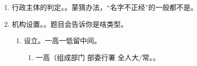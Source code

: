 \begin{enumerate}
\begin{enumerate}
\begin{enumerate}
                  \item 后天公法人 = 法律、法规、规章授权无行政权能组织。。
                  \item vs 委托。是委托关系，不是公法人，
                \end{enumerate}
                \begin{kk}{委托 vs 授权}
                  \begin{enumerate}
                    \item 这事我能委托还是授权给你我说了不算，得看法律、法规、规章咋说的。
                    \item {}（谁给你这个权力去授权的）。
                          \begin{enumerate}
                            \item 强制执行权 \yjt 只能法律。
                            \item 强制措施权 \yjt 只能法律、行政法规。
                            \item 普通权力（有单行立法） \yjt 法律、法规。。
                            \item 一般权力（没有单行立法） \yjt 法律、法规、规章。。
                          \end{enumerate}
                    \item {}不同。授权 \yjt 是行政主体，以自己名义对外管理，并承担法律后果。
                    \item {}不同。授权 \yjt 法律、法规。委托 \yjt 行政机关委托。
                    \item {}不同。授权 \yjt 自己承担。受委托组织 \yjt 委托机关承担法律后果。
                  \end{enumerate}
                \end{kk}
        \end{enumerate}
  \item 行政主体的判定。。蒙猜办法，“名字不正经”的一般都不是。
  \item 机构设置。。题目会告诉你是啥类型。
        \begin{enumerate}
          \item 设立。一高一低留中间。
                \begin{enumerate}
                  \item 一高（组成部门 \yjt 部委行署 \yjt 全人大/常。。

\end{enumerate}
\end{enumerate}
\end{enumerate}
